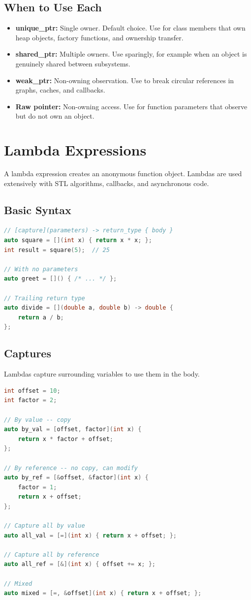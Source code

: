 \subsection{When to Use Each}

\begin{itemize}
\item \textbf{unique\_ptr:} Single owner. Default choice. Use for class members that own heap objects, factory functions, and ownership transfer.
\item \textbf{shared\_ptr:} Multiple owners. Use sparingly, for example when an object is genuinely shared between subsystems.
\item \textbf{weak\_ptr:} Non-owning observation. Use to break circular references in graphs, caches, and callbacks.
\item \textbf{Raw pointer:} Non-owning access. Use for function parameters that observe but do not own an object.
\end{itemize}

\section{Lambda Expressions}

A lambda expression creates an anonymous function object. Lambdas are used extensively with STL algorithms, callbacks, and asynchronous code.

\subsection{Basic Syntax}

\begin{lstlisting}[language=C++]
// [capture](parameters) -> return_type { body }
auto square = [](int x) { return x * x; };
int result = square(5);  // 25

// With no parameters
auto greet = []() { /* ... */ };

// Trailing return type
auto divide = [](double a, double b) -> double {
    return a / b;
};
\end{lstlisting}

\subsection{Captures}

Lambdas capture surrounding variables to use them in the body.

\begin{lstlisting}[language=C++]
int offset = 10;
int factor = 2;

// By value -- copy
auto by_val = [offset, factor](int x) {
    return x * factor + offset;
};

// By reference -- no copy, can modify
auto by_ref = [&offset, &factor](int x) {
    factor = 1;
    return x + offset;
};

// Capture all by value
auto all_val = [=](int x) { return x + offset; };

// Capture all by reference
auto all_ref = [&](int x) { offset += x; };

// Mixed
auto mixed = [=, &offset](int x) { return x + offset; };
\end{lstlisting}

